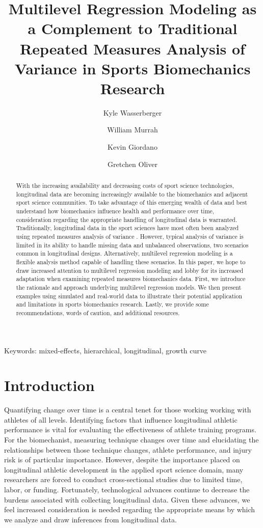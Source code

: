 \documentclass[
]{article}
\title{Multilevel Regression Modeling as a Complement to Traditional Repeated Measures Analysis of Variance in Sports Biomechanics Research}
\date{\vspace{-2.5em}}
\author[1,2]{\footnotesize Kyle Wasserberger}
\author[3]{\footnotesize William Murrah}
\author[4]{\footnotesize Kevin Giordano}
\author[2]{\footnotesize Gretchen Oliver}
\affil[1]{Research \& Development; Driveline Baseball}
\affil[2]{School of Kinesiology; Auburn University}
\affil[3]{\footnotesize Department of Educational Foundations, Leadership, \& Technology; Auburn University}
\affil[4]{\footnotesize Department of Physical Therapy; Creighton University}
\begin{document}
\maketitle

\begin{center}
Keywords: mixed-effects, hierarchical, longitudinal, growth curve
\end{center}

\newpage
\linenumbers
\begin{abstract}
\doublespacing
With the increasing availability and decreasing costs of sport science technologies, longitudinal data are becoming increasingly available to the biomechanics and adjacent sport science communities. To take advantage of this emerging wealth of data and best understand how biomechanics influence health and performance over time, consideration regarding the appropriate handling of longitudinal data is warranted. Traditionally, longitudinal data in the sport sciences have most often been analyzed using repeated measures analysis of variance . However, typical analysis of variance is limited in its ability to handle missing data and unbalanced observations, two scenarios common in longitudinal designs. Alternatively, multilevel regression modeling is a flexible analysis method capable of handling these scenarios. In this paper, we hope to draw increased attention to multilevel regression modeling and lobby for its increased adaptation when examining repeated measures biomechanics data. First, we introduce the rationale and approach underlying multilevel regression models. We then present examples using simulated and real-world data to illustrate their potential application and limitations in sports biomechanics research. Lastly, we provide some recommendations, words of caution, and additional resources.
\end{abstract}

\newpage
{}

\hypertarget{introduction}{%
\section{Introduction}\label{introduction}}

\doublespacing

Quantifying change over time is a central tenet for those working working with athletes of all levels. Identifying factors that influence longitudinal athletic performance is vital for evaluating the effectiveness of athlete training programs. For the biomechanist, measuring technique changes over time and elucidating the relationships between those technique changes, athlete performance, and injury risk is of particular importance. However, despite the importance placed on longitudinal athletic development in the applied sport science domain, many researchers are forced to conduct cross-sectional studies due to limited time, labor, or funding. Fortunately, technological advances continue to decrease the burdens associated with collecting longitudinal data. Given these advances, we feel increased consideration is needed regarding the appropriate means by which we analyze and draw inferences from longitudinal data.
\end{document}
